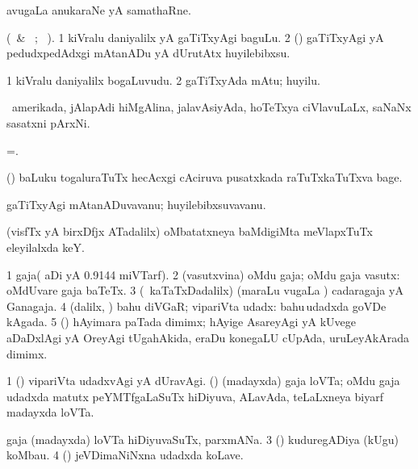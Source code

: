  avugaLa anukaraNe yA samathaRne.
\eanum
\emng
\eentry

\bentry
{} 
\gl{\akirx} 
\bmng
(\BU\ \& \BUkaq\ ; \vakaq\ ). 
\bnum
\num{1} kiVralu daniyalilx yA gaTiTxyAgi baguLu. 
\num{2} (\AmA) gaTiTxyAgi yA pedudxpedAdxgi mAtanADu yA dUrutAtx huyilebibxsu.
\enum
\emng
\eentry

\bentry
{} 
\gl{\nA}
\bmng
\bnum
\num{1} kiVralu daniyalilx bogaLuvudu. 
\num{2} gaTiTxyAda mAtu; huyilu.
\enum
\emng
\eentry

\bentry
{} 
\gl{\nA} 
\bmng
\da\ amerikada, jAlapAdi hiMgAlina, jalavAsiyAda, hoTeTxya ciVlavuLaLx, saNaNx sasatxni pArxNi.
\emng
\eentry

\bentry 
{} 
\gl{\nA}
\bmng
=.
\emng 
\eentry

\bentry
{} 
\gl{\nA} 
\bmng
(\birx) baLuku togaluraTuTx hecAcxgi cAciruva pusatxkada raTuTxkaTuTxva bage.
\emng
\eentry

\bentry
{} 
\gl{\nA} 
\bmng
gaTiTxyAgi mAtanADuvavanu; huyilebibxsuvavanu.
\emng
\eentry

\bentry
{} 
\gl{\nA} 
\bmng
(visfTx  yA birxDfjx ATadalilx) oMbatatxneya baMdigiMta meVlapxTuTx eleyilalxda keY.
\emng
\eentry

\bentry
{} 
\gl{\nA} 
\bmng
\bnum
\num{1} gaja( aDi yA 0.9144 miVTarf).
\num{2} (vasutxvina) oMdu gaja; oMdu gaja vasutx:  oMdUvare gaja baTeTx. 
\num{3} (\kanmu\ kaTaTxDadalilx) (maraLu \mo vugaLa \vi) cadaragaja yA Ganagaja.
\num{4} (\bava dalilx, \AmA) bahu diVGaR; vipariVta udadx:   bahu\,udadxda goVDe kAgada. 
\num{5} (\nw) hAyimara paTada dimimx; hAyige AsareyAgi yA kUvege aDaDxlAgi yA OreyAgi tUgahAkida, eraDu konegaLU cUpAda, uruLeyAkArada dimimx.
\enum
\emng

\noindent
\gl{\pagu}
\bmng
\bnum
\num{1}  (\rUpa) vipariVta udadxvAgi yA dUravAgi. 
  (\birx) 
\banum
{}  (madayxda) gaja loVTa; oMdu gaja udadxda matutx  peYMTfgaLaSuTx hiDiyuva, ALavAda, teLaLxneya biyarf madayxda loVTa.

 gaja (madayxda) loVTa hiDiyuvaSuTx, parxmANa. 
\eanum
\numie
\num{3}  (\birx) kuduregADiya (kUgu) koMbau. 
\num{4}  (\birx) jeVDimaNiNxna udadxda koLave.
\enum
\emng
\eentry

